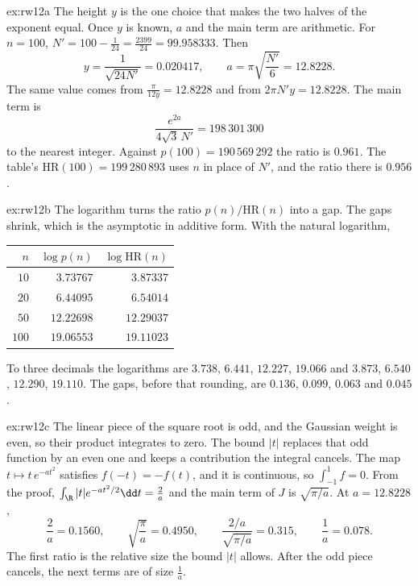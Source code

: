 \begin{solution}{ex:rw12a}
\idea The height $y$ is the one choice that makes the two halves of the exponent equal. Once $y$ is known, $a$ and the main term are arithmetic.
\writeup For $n=100$, $N'=100-\frac1{24}=\frac{2399}{24}=99.958333$. Then
\[
y=\frac1{\sqrt{24N'}}=0.020417,\qquad a=\pi\sqrt{\frac{N'}6}=12.8228.
\]
The same value comes from $\frac\pi{12y}=12.8228$ and from $2\pi N'y=12.8228$. The main term is
\[
\frac{e^{2a}}{4\sqrt3\,N'}=198\,301\,300
\]
to the nearest integer. Against $p(100)=190\,569\,292$ the ratio is $0.961$. The table's $\mathrm{HR}(100)=199\,280\,893$ uses $n$ in place of $N'$, and the ratio there is $0.956$.
\end{solution}

\begin{solution}{ex:rw12b}
\idea The logarithm turns the ratio $p(n)/\mathrm{HR}(n)$ into a gap. The gaps shrink, which is the asymptotic in additive form.
\writeup With the natural logarithm,
\begin{center}
\begin{tabular}{rrr}
$n$ & $\log p(n)$ & $\log\mathrm{HR}(n)$\\\hline
$10$ & $3.73767$ & $3.87337$\\
$20$ & $6.44095$ & $6.54014$\\
$50$ & $12.22698$ & $12.29037$\\
$100$ & $19.06553$ & $19.11023$
\end{tabular}
\end{center}
To three decimals the logarithms are $3.738$, $6.441$, $12.227$, $19.066$ and $3.873$, $6.540$, $12.290$, $19.110$. The gaps, before that rounding, are $0.136$, $0.099$, $0.063$ and $0.045$.
\end{solution}

\begin{solution}{ex:rw12c}
\idea The linear piece of the square root is odd, and the Gaussian weight is even, so their product integrates to zero. The bound $|t|$ replaces that odd function by an even one and keeps a contribution the integral cancels.
\writeup The map $t\mapsto t\,e^{-at^2}$ satisfies $f(-t)=-f(t)$, and it is continuous, so $\int_{-1}^1 f=0$. From the proof, $\int_{\R}|t|e^{-at^2/2}\dd t=\frac2a$ and the main term of $J$ is $\sqrt{\pi/a}$. At $a=12.8228$,
\[
\frac2a=0.1560,\qquad\sqrt{\frac\pi a}=0.4950,\qquad\frac{2/a}{\sqrt{\pi/a}}=0.315,\qquad\frac1a=0.078.
\]
The first ratio is the relative size the bound $|t|$ allows. After the odd piece cancels, the next terms are of size $\frac1a$.
\end{solution}

